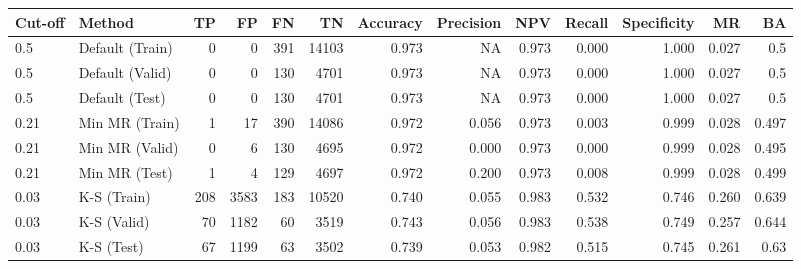 \begin{table}[H]
	\centering
	\resizebox{\textwidth}{!}
	{
		\begin{tabular}{l|l|r|r|r|r|r|r|r|r|r|r|r}
			\hline
			\textbf{Cut-off} & \textbf{Method} & \textbf{TP} & \textbf{FP} & \textbf{FN} & \textbf{TN} & \textbf{Accuracy} & \textbf{Precision} & \textbf{NPV} & \textbf{Recall} & \textbf{Specificity} & \textbf{MR} & \textbf{BA}  \\ \hline
			0.5             & Default (Train) & 0           & 0           & 391         & 14103       & 0.973             & NA                 & 0.973        & 0.000           & 1.000                & 0.027   & 0.5    \\
			0.5             & Default (Valid) & 0           & 0           & 130         & 4701        & 0.973             & NA                 & 0.973        & 0.000           & 1.000                & 0.027  & 0.5     \\
			0.5             & Default (Test)  & 0           & 0           & 130         & 4701        & 0.973             & NA          & 0.973        & 0.000           & 1.000                & 0.027  & 0.5     \\ \hline
			
			0.21            & Min MR (Train)  & 1           & 17          & 390         & 14086       & 0.972             & 0.056              & 0.973        & 0.003           & 0.999                & 0.028    & 0.497   \\
			0.21            & Min MR (Valid)  & 0           & 6           & 130         & 4695        & \cellcolor{yellow!25}0.972             & 0.000              & 0.973        & 0.000           & \cellcolor{yellow!25}0.999                & \cellcolor{yellow!25}0.028    & 0.495   \\
			0.21            & Min MR (Test)   & 1           & 4           & 129         & 4697        & 0.972             & 0.200              & 0.973        & 0.008           & 0.999                & 0.028  & 0.499     \\ \hline
			
			0.03            & K-S (Train)     & 208         & 3583        & 183         & 10520       & 0.740             & 0.055              & 0.983        & 0.532           & 0.746                & 0.260    &  0.639  \\
			0.03            & K-S (Valid)      & 70          & 1182        & 60          & 3519        & 0.743             & 0.056              & \cellcolor{yellow!25}0.983        & \cellcolor{yellow!25}0.538           & 0.749                & 0.257  & \cellcolor{yellow!25}0.644     \\
			0.03            & K-S (Test)     & 67          & 1199        & 63          & 3502        & 0.739             & 0.053              & 0.982        & 0.515           & 0.745                & 0.261  & 0.63     \\ \hline
			

\end{tabular}}
\end{table}
